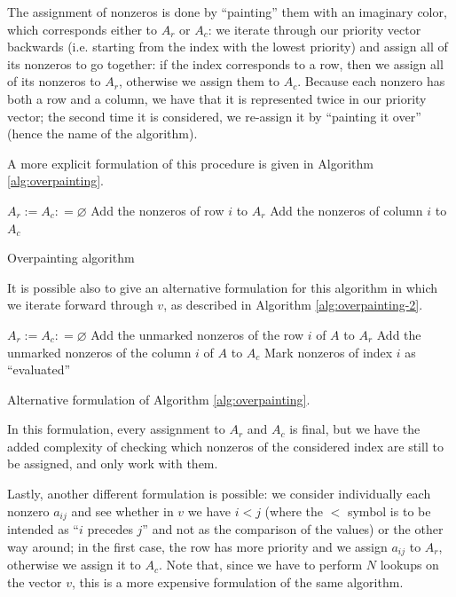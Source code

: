 The assignment of nonzeros is done by ``painting'' them with an imaginary color, which corresponds either to $A_r$ or $A_c$: we iterate through our priority vector backwards (i.e. starting from the index with the lowest priority) and assign all of its nonzeros to go together: if the index corresponds to a row, then we assign all of its nonzeros to $A_r$, otherwise we assign them to $A_c$. Because each nonzero has both a row and a column, we have that it is represented twice in our priority vector; the second time it is considered, we re-assign it by ``painting it over'' (hence the name of the algorithm).

A more explicit formulation of this procedure is given in Algorithm \ref{alg:overpainting}.

\begin{algorithm}[h]
	\begin{algorithmic}
		\State $A_r := A_c: = \varnothing$
		\State Add the nonzeros of row $i$ to $A_r$
		\Else
		\State Add the nonzeros of column $i$ to $A_c$
		\EndIf
		\EndFor
	\end{algorithmic}
	\caption{Overpainting algorithm} \label{alg:overpainting}
\end{algorithm}

It is possible also to give an alternative formulation for this algorithm in which we iterate forward through $v$, as described in Algorithm \ref{alg:overpainting-2}.

\begin{algorithm}[h]
	\begin{algorithmic}
		\Require{Priority vector $v$, matrix $A$}
		\Ensure{$A_r$, $A_c$}
		\State $A_r := A_c: = \varnothing$
		\For{$i=0,\dots,m+n-1$}
		\If{$v_i < m$}
		\State Add the unmarked nonzeros of the row $i$ of $A$ to $A_r$
		\Else
		\State Add the unmarked nonzeros of the column $i$ of $A$ to $A_c$
		\EndIf
		\State Mark nonzeros of index $i$ as ``evaluated''
		\EndFor
	\end{algorithmic}
	\caption{Alternative formulation of Algorithm \ref{alg:overpainting}.} \label{alg:overpainting-2}
\end{algorithm}

In this formulation, every assignment to $A_r$ and $A_c$ is final, but we have the added complexity of checking which nonzeros of the considered index are still to be assigned, and only work with them.

Lastly, another different formulation is possible: we consider individually each nonzero $a_{ij}$ and see whether in $v$ we have $i < j$ (where the $<$ symbol is to be intended as ``$i$ precedes $j$'' and not as the comparison of the values) or the other way around; in the first case, the row has more priority and we assign $a_{ij}$ to $A_r$, otherwise we assign it to $A_c$. Note that, since we have to perform $N$ lookups on the vector $v$, this is a more expensive formulation of the same algorithm.


